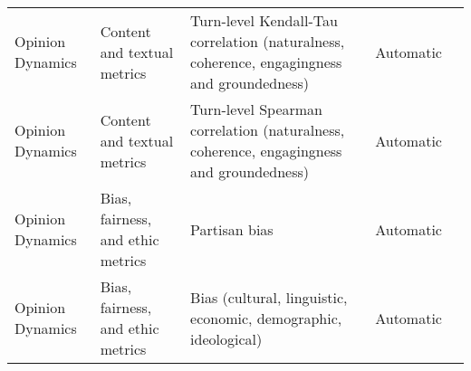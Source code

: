 \begin{small}
\begin{center}
\begin{longtable}{@{}p{}p{}p{}p{}p{}@{}}
Opinion Dynamics         & Content and textual metrics         & Turn-level Kendall-Tau correlation (naturalness, coherence, engagingness and groundedness)                                                                                                                  & Automatic & \cite{Chan2023ChatEvalTB}                                                                                                                                                                                                                                                                                                                                                                                                  \\
Opinion Dynamics         & Content and textual metrics         & Turn-level Spearman correlation (naturalness, coherence, engagingness and groundedness)                                                                                                                     & Automatic & \cite{Chan2023ChatEvalTB}                                                                                                                                                                                                                                                                                                                                                                                                  \\
Opinion Dynamics         & Bias, fairness, and ethic metrics   & Partisan bias                                                                                                                                                                                               & Automatic & \cite{Chuang2023TheWO}                                                                                                                                                                                                                                                                                                                                                                                        \\
Opinion Dynamics         & Bias, fairness, and ethic metrics   & Bias (cultural, linguistic, economic, demographic, ideological)                                                                                                                                             & Automatic & \cite{qu2024performance}                                                                                                                                                                                                                                                                                                                                                                                  \\

\end{longtable}
\end{center}
\end{small}
